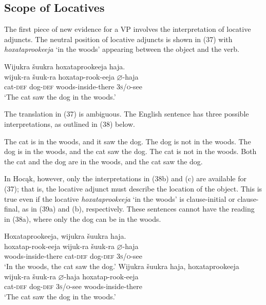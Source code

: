 \documentclass[output=paper]{LSP/langsci}
\begin{document}
\subsection{Scope of Locatives}

The first piece of new evidence for a VP involves the interpretation of locative adjuncts. The neutral position of locative adjuncts is shown in (37) with \textit{hoxataprookeeja} `in the woods' appearing between the object and the verb.

\begin{exe}
\ex 
\glll Wijukra	\v{s}uukra		hoxataprookeeja		haja.\\
wijuk-ra	\v{s}uuk-ra		hoxatap-rook-eeja		$\varnothing$-haja \\
cat-\textsc{def}		dog-\textsc{def} 	woods-inside-there	\textsc{3s/o}-see \\
\trans `The cat saw the dog in the woods.' 
\end{exe}

The translation in (37) is ambiguous. The English sentence has three possible interpretations, as outlined in (38) below.

\begin{exe}
\ex 
\begin{xlist}
\ex The cat is in the woods, and it saw the dog. The dog is not in the woods. 
\ex The dog is in the woods, and the cat saw the dog. The cat is not in the woods.
\ex Both the cat and the dog are in the woods, and the cat saw the dog.
\end{xlist}
\end{exe}

In Hocąk, however, only the interpretations in (38b) and (c) are available for (37); that is, the locative adjunct must describe the location of the object. This is true even if the locative \textit{hoxataprookeeja} `in the woods' is clause-initial or clause-final, as in (39a) and (b), respectively. These sentences cannot have the reading in (38a), where only the dog can be in the woods.

\begin{exe}
\ex
\begin{xlist}
\ex 
\glll Hoxataprookeeja, 		wijukra	\v{s}uukra			haja.\\
hoxatap-rook-eeja		wijuk-ra	\v{s}uuk-ra		$\varnothing$-haja \\
	woods-inside-there 	cat-\textsc{def}		dog-\textsc{def}		\textsc{3s/o}-see \\
\trans `In the woods, the cat saw the dog.'
\ex 
\glll Wijukra	\v{s}uukra			haja,				hoxataprookeeja\\
wijuk-ra	\v{s}uuk-ra		$\varnothing$-haja			hoxatap-rook-eeja \\
	cat-\textsc{def}		dog-\textsc{def}		\textsc{3s/o}-see	woods-inside-there \\
\trans `The cat saw the dog in the woods.'
\end{xlist}
\end{exe}
	
\end{document}
